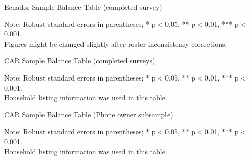 \documentclass[11pt,harvard]{article}
\begin{document}
	
\begin{table}[htbp]
		\centering
		\begin{adjustbox}{max width=\textwidth}
			\begin{threeparttable}
				\caption{Ecuador Sample Balance Table (completed survey)}
				\scriptsize
				 
				\label{tab:Ecuador_Modality_Demo_Balance}
				\begin{tablenotes}
					\item Note: Robust standard errors in parentheses; * p$<$0.05, ** p$<$0.01, *** p$<$0.001. \\
					Figures might be changed slightly after roster inconsistency corrections.
				\end{tablenotes}
			\end{threeparttable}
		\end{adjustbox}
\end{table}
	
	
	\begin{table}[htbp]
		\centering
		\begin{adjustbox}{max width=\textwidth}
			\begin{threeparttable}
				\caption{CAR Sample Balance Table (completed surveys)}
				\scriptsize
				 
				\label{tab:CAR_Modality_Demo_Balance}
				\begin{tablenotes}
					\item Note: Robust standard errors in parentheses; * p$<$0.05, ** p$<$0.01, *** p$<$0.001. \\
					Household listing information was used in this table.
				\end{tablenotes}
			\end{threeparttable}
		\end{adjustbox}
	\end{table}
	
	
	
\begin{table}[htbp]
		\centering
		\begin{adjustbox}{max width=\textwidth}
			\begin{threeparttable}
				\caption{CAR Sample Balance Table (Phone owner subsample)}
				\scriptsize
				 
				\label{tab:CAR_Modality_Own_Phone_Demo_Balance}
				\begin{tablenotes}
					\item Note: Robust standard errors in parentheses; * p$<$0.05, ** p$<$0.01, *** p$<$0.001. \\
					Household listing information was used in this table.
				\end{tablenotes}
			\end{threeparttable}
		\end{adjustbox}
\end{table}
	
\end{document}
